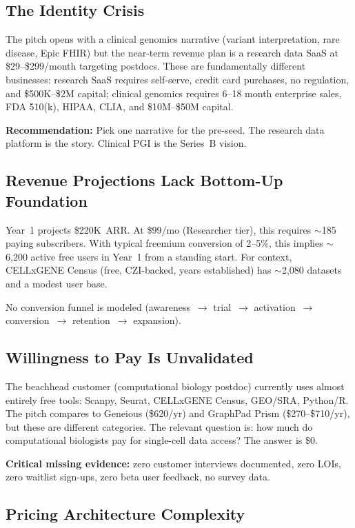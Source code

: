 \documentclass[10pt,twocolumn,letterpaper]{article}
\begin{document}
\subsection{The Identity Crisis}

The pitch opens with a clinical genomics narrative (variant interpretation, rare
disease, Epic FHIR) but the near-term revenue plan is a research data SaaS at
\$29--\$299/month targeting postdocs. These are fundamentally different businesses:
research SaaS requires self-serve, credit card purchases, no regulation, and
\$500K--\$2M capital; clinical genomics requires 6--18 month enterprise sales,
FDA 510(k), HIPAA, CLIA, and \$10M--\$50M capital.

\textbf{Recommendation:} Pick one narrative for the pre-seed. The research data
platform is the story. Clinical PGI is the Series~B vision.

\subsection{Revenue Projections Lack Bottom-Up Foundation}

Year~1 projects \$220K~ARR. At \$99/mo (Researcher tier), this requires
$\sim$185 paying subscribers. With typical freemium conversion of 2--5\%, this
implies $\sim$6,200 active free users in Year~1 from a standing start. For
context, CELLxGENE Census (free, CZI-backed, years established) has $\sim$2,080
datasets and a modest user base.

No conversion funnel is modeled (awareness~$\to$ trial~$\to$ activation~$\to$
conversion~$\to$ retention~$\to$ expansion).

\subsection{Willingness to Pay Is Unvalidated}

The beachhead customer (computational biology postdoc) currently uses almost
entirely free tools: Scanpy, Seurat, CELLxGENE Census, GEO/SRA, Python/R.
The pitch compares to Geneious (\$620/yr) and GraphPad Prism (\$270--\$710/yr),
but these are different categories. The relevant question is: how much do
computational biologists pay for single-cell data access? The answer is \$0.

\textbf{Critical missing evidence:} zero customer interviews documented, zero
LOIs, zero waitlist sign-ups, zero beta user feedback, no survey data.

\subsection{Pricing Architecture Complexity}
\end{document}
